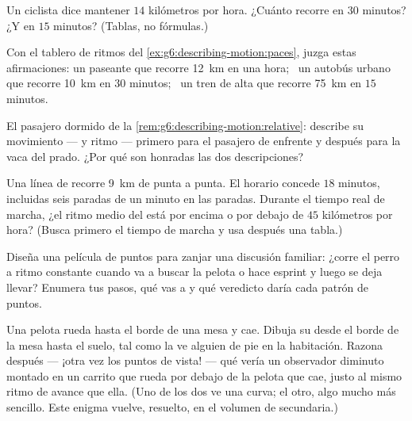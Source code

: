 \begin{exercise}[$\star$]\label{exo:g6:describing-motion:7}
Un ciclista dice mantener $14$ kilómetros por hora. ¿Cuánto recorre en
$30$ minutos? ¿Y en $15$ minutos? (Tablas, no fórmulas.)
\end{exercise}

\begin{exercise}[$\star$]\label{exo:g6:describing-motion:8}
Con el tablero de ritmos del \cref{ex:g6:describing-motion:paces},
juzga estas afirmaciones: un paseante que recorre \qty{12}{km} en una
hora; \ un autobús urbano que recorre \qty{10}{km} en $30$ minutos; \
un tren de alta  que recorre \qty{75}{km} en $15$ minutos.
\end{exercise}

\begin{exercise}[$\star\star$]\label{exo:g6:describing-motion:9}
El pasajero dormido de la \cref{rem:g6:describing-motion:relative}:
describe su movimiento ---  y ritmo --- primero para el
pasajero de enfrente y después para la vaca del prado. ¿Por qué son
honradas las dos descripciones?
\end{exercise}

\begin{exercise}[$\star\star$]\label{exo:g6:describing-motion:10}
Una línea de \omterm{def:g2:measuring-length:units}{metro} recorre \qty{9}{km} de punta a punta. El horario
concede $18$ minutos, incluidas seis paradas de un minuto en las
paradas. Durante el tiempo real de marcha, ¿el ritmo medio del
 está por encima o por debajo de $45$ kilómetros por hora? (Busca
primero el tiempo de marcha y usa después una tabla.)
\end{exercise}

\begin{exercise}[$\star\star$]\label{exo:g6:describing-motion:11}
Diseña una película de puntos para zanjar una discusión familiar:
¿corre el perro a ritmo constante cuando va a buscar la pelota o hace
esprint y luego se deja llevar? Enumera tus pasos, qué vas a
 y qué veredicto daría cada patrón de puntos.
\end{exercise}

\begin{exercise}[$\star\star\star$]\label{exo:g6:describing-motion:12}
Una pelota rueda hasta el borde de una mesa y cae. Dibuja su
 desde el borde de la mesa hasta el suelo, tal como la
ve alguien de pie en la habitación. Razona después --- ¡otra vez los
puntos de vista! --- qué  vería un observador diminuto
montado en un carrito que rueda por debajo de la pelota que cae,
justo al mismo ritmo de avance que ella. (Uno de los dos ve una
curva; el otro, algo mucho más sencillo. Este enigma vuelve, resuelto,
en el volumen de secundaria.)
\end{exercise}

